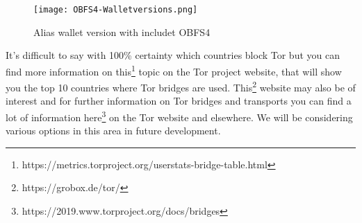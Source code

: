 \begin{figure}[h]
	\centering
	\texttt{[image: OBFS4-Walletversions.png]}
	\caption{Alias wallet version with includet OBFS4}
\end{figure}

\newpage
\noindent
It’s difficult to say with 100\% certainty which countries block Tor but
you can find more information on 
this\footnote{https://metrics.torproject.org/userstats-bridge-table.html}
topic on the Tor project website, that will show you the top 10 countries
where Tor bridges are used. This\footnote{https://grobox.de/tor/} website
may also be of interest and for further information on Tor bridges and
transports you can find a lot of information
here\footnote{https://2019.www.torproject.org/docs/bridges} on the Tor
website and elsewhere. We will be considering various options in this
area in future development.
